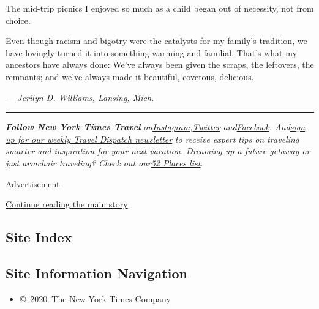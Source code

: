 The mid-trip picnics I enjoyed so much as a child began out of
necessity, not from choice.

Even though racism and bigotry were the catalysts for my family's
tradition, we have lovingly turned it into something warming and
familial. That's what my ancestors have always done: We've always been
given the scraps, the leftovers, the remnants; and we've always made it
beautiful, covetous, delicious.

\emph{--- Jerilyn D. Williams, Lansing, Mich.}

\begin{center}\rule{0.5\linewidth}{\linethickness}\end{center}

\emph{\textbf{Follow New York Times Travel}}
\emph{on}\href{https://www.instagram.com/nytimestravel/}{\emph{Instagram}}\emph{,}\href{https://twitter.com/nytimestravel}{\emph{Twitter}}
\emph{and}\href{https://www.facebookcorewwwi.onion/nytimestravel/}{\emph{Facebook}}\emph{.
And}\href{https://www.nytimes3xbfgragh.onion/newsletters/traveldispatch}{\emph{sign
up for our weekly Travel Dispatch newsletter}} \emph{to receive expert
tips on traveling smarter and inspiration for your next vacation.
Dreaming up a future getaway or just armchair traveling? Check out
our}\href{https://www.nytimes3xbfgragh.onion/interactive/2020/travel/places-to-visit.html}{\emph{52
Places list}}\emph{.}

Advertisement

\protect\hyperlink{after-bottom}{Continue reading the main story}

\hypertarget{site-index}{%
\subsection{Site Index}\label{site-index}}

\hypertarget{site-information-navigation}{%
\subsection{Site Information
Navigation}\label{site-information-navigation}}

\begin{itemize}
\tightlist
\item
  \href{https://help.nytimes3xbfgragh.onion/hc/en-us/articles/115014792127-Copyright-notice}{©~2020~The
  New York Times Company}
\end{itemize}

